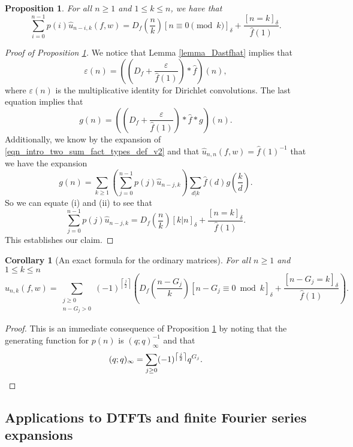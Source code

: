 \documentclass[12pt,reqno,a4letter]{article}
\numberwithin{figure}{section}
\numberwithin{table}{section}
\numberwithin{equation}{section}
\newcommand{\Iverson}[1]{\ensuremath{\left[#1\right]_{\delta}}}
\newcommand{\ceiling}[1]{\left\lceil #1 \right\rceil}
\theoremstyle{plain}
\newtheorem{prop}[theorem]{Proposition}
\newtheorem{cor}[theorem]{Corollary}
\numberwithin{theorem}{section}
\theoremstyle{definition}
\begin{document}
\begin{prop} 
\label{prop_exact_pnrec_for_hatunk} 
For all $n \geq 1$ and $1 \leq k \leq n$, we have that 
\[
\sum_{i=0}^{n-1} p(i) \widehat{u}_{n-i,k}(f, w) = D_f\left(\frac{n}{k}\right) 
     \Iverson{n \equiv 0 \pmod{k}} + \frac{\Iverson{n = k}}{\widehat{f}(1)}. 
\] 
\end{prop} 
\begin{proof}[Proof of Proposition \ref{prop_exact_pnrec_for_hatunk}] 
We notice that Lemma \ref{lemma_Dastfhat} implies that 
\[
\varepsilon(n) = \left(\left(D_f + \frac{\varepsilon}{\widehat{f}(1)}\right) \ast 
     \widehat{f}\right)(n), 
\] 
where $\varepsilon(n)$ is the multiplicative identity for Dirichlet convolutions. 
The last equation implies that 
\[
\tag{i} 
g(n) = \left(\left(D_f + \frac{\varepsilon}{\widehat{f}(1)}\right) \ast 
     \widehat{f} \ast g\right)(n).  
\] 
Additionally, we know by the expansion of 
\eqref{eqn_intro_two_sum_fact_types_def_v2} and that 
$\widehat{u}_{n,n}(f, w) = \widehat{f}(1)^{-1}$ that we have the expansion 
\[
\tag{ii} 
g(n) = \sum_{k \geq 1} \left(\sum_{j=0}^{n-1} p(j) \widehat{u}_{n-j,k}\right) 
     \sum_{d|k} \widehat{f}(d) g\left(\frac{k}{d}\right). 
\] 
So we can equate (i) and (ii) to see that 
\[
\sum_{j=0}^{n-1} p(j) \widehat{u}_{n-j,k} = D_f\left(\frac{n}{k}\right) \Iverson{k | n} + 
     \frac{\Iverson{n=k}}{\widehat{f}(1)}. 
\] 
This establishes our claim. 
\end{proof} 

\begin{cor}[An exact formula for the ordinary matrices] 
\label{cor_exact_formula_for_hatunkfw} 
For all $n \geq 1$ and $1 \leq k \leq n$ 
\[
\widehat{u}_{n,k}(f, w) = \sum_{\substack{j \geq 0 \\ n-G_j > 0}} 
     (-1)^{\ceiling{\frac{j}{2}}} \left(D_f\left(\frac{n-G_j}{k}\right) 
     \Iverson{n-G_j \equiv 0 \bmod{k}} + \frac{\Iverson{n-G_j = k}}{\widehat{f}(1)} 
     \right). 
\]
\end{cor} 
\begin{proof} 
This is an immediate consequence of Proposition \ref{prop_exact_pnrec_for_hatunk} 
by noting that the generating function for $p(n)$ is $(q; q)_{\infty}^{-1}$ and that 
\[
(q; q)_{\infty} = \sum_{j \geq 0} (-1)^{\ceiling{\frac{j}{2}}} q^{G_j}. 
     \qedhere
\]
\end{proof} 

\subsection{Applications to DTFTs and finite Fourier series expansions} 
\label{subSection_DFT_exps} 
\end{document}
